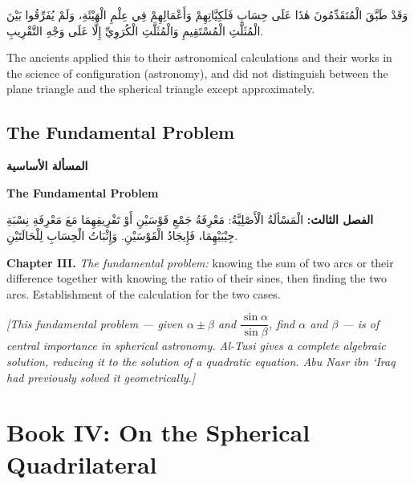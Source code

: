 \documentclass[11pt,a4paper]{article}
\theoremstyle{plain}
\theoremstyle{definition}
\theoremstyle{remark}
\newcommand{\ar}[1]{{\arabicfont\beginR #1\endR}}
\newcommand{\bilingualpair}[2]{%
  \par\noindent
  \begin{minipage}[t]{0.48\textwidth}
  #1
  \end{minipage}%
  \hfill
  \begin{minipage}[t]{0.48\textwidth}
  \vspace*{0pt}#2
  \end{minipage}\par\vspace{0.3cm}%
}
\begin{document}
\vspace{0.3cm}

\bilingualpair{\ar{وَقَدْ طَبَّقَ الْمُتَقَدِّمُونَ هٰذَا عَلَى حِسَابِ فَلَكِيَّاتِهِمْ وَأَعْمَالِهِمْ فِي عِلْمِ الْهَيْئَةِ، وَلَمْ يُفَرِّقُوا بَيْنَ الْمُثَلَّثِ الْمُسْتَقِيمِ وَالْمُثَلَّثِ الْكُرَوِيِّ إِلَّا عَلَى وَجْهِ التَّقْرِيبِ.}}{The ancients applied this to their astronomical calculations and their works in the science of configuration (astronomy), and did not distinguish between the plane triangle and the spherical triangle except approximately.}

\vspace{0.5cm}

\subsection{The Fundamental Problem}
\label{sec:fundamental-problem}

\bilingualpair{\noindent\textcolor{arabicblue}{\textbf{\ar{المسألة الأساسية}}}}{\noindent\textcolor{sectioncolor}{\textbf{The Fundamental Problem}}}

\vspace{0.3cm}

\bilingualpair{\ar{\textbf{الفصل الثالث:} الْمَسْألَةُ الْأَصْلِيَّةُ: مَعْرِفَةُ جَمْعِ قَوْسَيْنِ أَوْ تَفْرِيقِهِمَا مَعَ مَعْرِفَةِ نِسْبَةِ جِيْبَيْهِمَا، فَإِيجَادُ الْقَوْسَيْنِ. وَإِثْبَاتُ الْحِسَابِ لِلْحَالَتَيْنِ.}}{\noindent\textbf{Chapter III.} \textit{The fundamental problem:} knowing the sum of two arcs or their difference together with knowing the ratio of their sines, then finding the two arcs. Establishment of the calculation for the two cases.}

\vspace{0.3cm}

\noindent\textit{[This fundamental problem --- given $\alpha \pm \beta$ and $\dfrac{\sin\alpha}{\sin\beta}$, find $\alpha$ and $\beta$ --- is of central importance in spherical astronomy. Al-Tusi gives a complete algebraic solution, reducing it to the solution of a quadratic equation. Abu Nasr ibn `Iraq had previously solved it geometrically.]}

\clearpage

\section{Book IV: On the Spherical Quadrilateral}
\label{sec:book4}
\end{document}
